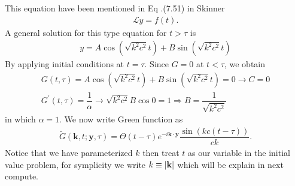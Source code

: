 \documentclass{article}
\newcommand{\f}[2]{\dfrac{#1}{#2}}
\begin{document}
This equation have been mentioned in Eq .(7.51) in Skinner
\begin{gather}
	\mathcal{L} y = f(t).
\end{gather}
A general solution for this type equation for $t > \tau$ is 
\begin{gather}
	y = A\cos(\sqrt{k^{2} c^{2}}t) + B\sin(\sqrt{k^{2} c^{2}}t)
\end{gather}	
By applying initial conditions at $t = \tau$. Since $G = 0$ at $t < \tau$, we obtain
\begin{gather}
	G(t, \tau) = A\cos(\sqrt{k^{2} c^{2}}t) + B\sin(\sqrt{k^{2} c^{2}}t) = 0 \rightarrow C = 0\\
	G^{'}(t, \tau) = \f{1}{\alpha} \rightarrow \sqrt{k^{2} c^{2}} B \cos 0 = 1 \Rightarrow B = \f{1}{\sqrt{k^{2} c^{2}}}
\end{gather}
in which $\alpha = 1$. We now write Green function as 
\begin{gather}
	\tilde{G} (\mathbf{k}, t; \mathbf{y},\tau) = \Theta(t - \tau) e^{-i \mathbf{k} \cdot \mathbf{y}} \f{\sin ( k c (t - \tau) )}{c k}. 
\end{gather}
Notice that we have parameterized $k$ then treat $t$ as our variable in the initial value problem, for symplicity we write $k \equiv \abs{\mathbf{k}}$ which will be explain in next compute. 
\end{document}

